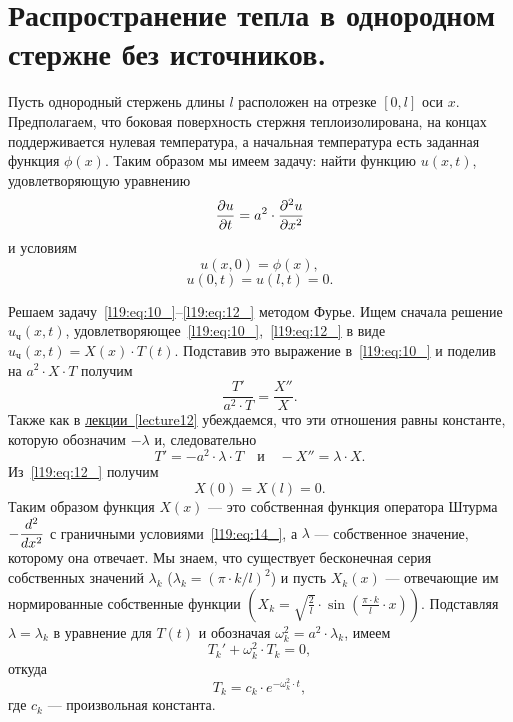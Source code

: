 \section{Распространение тепла в однородном стержне без источников.}
\label{lecture19section2}
Пусть однородный стержень длины $l$ расположен на отрезке $[0,l]$ оси $x$. Предполагаем, что боковая поверхность стержня теплоизолирована, на концах поддерживается нулевая температура, а начальная температура есть заданная функция $\phi(x)$. Таким образом мы имеем задачу: найти функцию $u(x,t)$, удовлетворяющую уравнению
\begin{equation}\label{l19:eq:10_}
	\frac{\partial u}{\partial t}=a^2\cdot\frac{\partial^2u}{\partial x^2}
\end{equation}
и условиям
\begin{equation}\label{l19:eq:11_}
	 u(x,0)=\phi(x),
\end{equation}
\begin{equation}\label{l19:eq:12_}
	 u(0,t)=u(l,t)=0.
\end{equation}

Решаем задачу~\eqref{l19:eq:10_}--\eqref{l19:eq:12_} методом Фурье. Ищем сначала решение $u_{\text{ч}}(x,t)$, удовлетворяющее~\eqref{l19:eq:10_},~\eqref{l19:eq:12_} в виде $u_{\text{ч}}(x,t)=X(x)\cdot T(t)$. Подставив это выражение в~\eqref{l19:eq:10_} и поделив на $a^2\cdot X\cdot T$ получим
\begin{equation}\label{l19:eq:13_}
	\frac{T'}{a^2\cdot T}=\frac{X''}{X}.
\end{equation}
Также как в \hyperref[lecture12]{лекции~\ref*{lecture12}} убеждаемся, что эти отношения равны константе, которую обозначим $-\lambda$ и, следовательно
\begin{equation*}
	 T'=-a^2\cdot\lambda\cdot T\quad\text{и}\quad -X''=\lambda\cdot X.
\end{equation*} 
Из~\eqref{l19:eq:12_} получим
\begin{equation}\label{l19:eq:14_}
	 X(0)=X(l)=0.
\end{equation}
Таким образом функция $X(x)$ --- это собственная функция оператора Штурма $\displaystyle-\frac{d^2}{dx^2}$ с граничными условиями~\eqref{l19:eq:14_}, а $\lambda$ --- собственное значение, которому она отвечает. Мы знаем, что существует бесконечная серия собственных значений $\lambda_k$ ($\lambda_k=(\pi\cdot k/l)^2$) и пусть $X_k(x)$ --- отвечающие им нормированные собственные функции $\left(X_k=\sqrt{\frac{2}{l}}\cdot\sin\left(\frac{\pi\cdot k}{l}\cdot x\right)\right)$. Подставляя $\lambda=\lambda_k$ в уравнение для $T(t)$ и обозначая $\omega_k^2=a^2\cdot\lambda_k$, имеем 
\begin{equation*}
	 T_k'+\omega_k^2\cdot T_k=0,
\end{equation*}
откуда
\begin{equation*}
	 T_k=c_k\cdot e^{-\omega_k^2\cdot t},
\end{equation*}
где $c_k$ --- произвольная константа.

